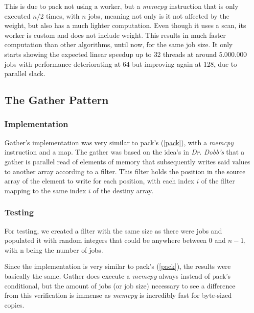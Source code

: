 \documentclass[10pt,journal]{IEEEtran}
\begin{document}
This is due to pack not using a worker, but a \textit{memcpy} instruction that is only executed $ n / 2 $ times, with $ n $ jobs, meaning not only is it not affected by the weight, but also has a much lighter computation. Even though it uses a scan, its worker is custom and does not include weight. This results in much faster computation than other algorithms, until now, for the same job size. It only starts showing the expected linear speedup up to 32 threads at around 5.000.000 jobs with performance deteriorating at 64 but improving again at 128, due to parallel slack.

\subsection{The Gather Pattern}
\label{gather}

\subsubsection{Implementation}

Gather's implementation was very similar to pack's (\ref{pack}), with a \textit{memcpy} instruction and a map. The gather was based on the idea's in \textit{Dr. Dobb's} that a gather is parallel read of elements of memory that subsequently writes said values to another array according to a filter. This filter holds the position in the source array of the element to write for each position, with each index $ i $ of the filter mapping to the same index $ i $ of the destiny array.

\subsubsection{Testing}

For testing, we created a filter with the same size as there were jobs and populated it with random integers that could be anywhere between 0 and $ n - 1 $, with n being the number of jobs.

Since the implementation is very similar to pack's (\ref{pack}), the results were basically the same. Gather does execute a \textit{memcpy} always instead of pack's conditional, but the amount of jobs (or job size) necessary to see a difference from this verification is immense as \textit{memcpy} is incredibly fast for byte-sized copies.

\end{document}
